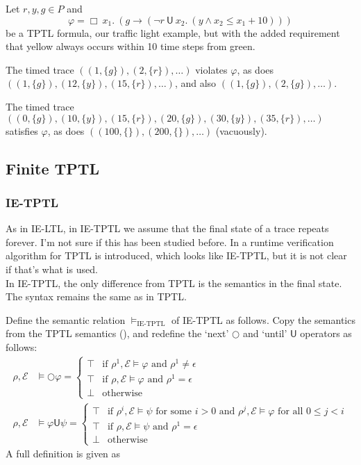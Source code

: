 \documentclass[a4paper]{article}
\newcommand{\U}{\mathsf{U}}
\newcommand{\tand}{\text{ and }}
\newcommand{\fsome}{\text{ for some }}
\newcommand{\fall}{\text{ for all }}
\newcommand{\eval}{\mathcal{E}}
\begin{document}
\begin{eg}\label{tptleg}
  Let $r,y,g\in P$ and \[\varphi = \Box ~x_1.~ (g \to (\neg r ~\U~ x_2.~ (y \land x_2 \leq x_1 + 10) ))\] be a TPTL formula, our traffic light example, but with the added requirement that yellow always occurs within 10 time steps from green.

  The timed trace $((1,\{g\}),(2,\{r\}),\dots)$ violates $\varphi$, as does $((1,\{g\}),(12,\{y\}),(15,\{r\}),\dots)$, and also $((1,\{g\}),(2,\{g\}),\dots)$.

  The timed trace $((0,\{g\}),(10,\{y\}),(15,\{r\}),(20,\{g\}),(30,\{y\}),(35,\{r\}),\dots)$ satisfies $\varphi$, as does $((100,\{\}),(200,\{\}),\dots)$ (vacuously).

\end{eg}

\subsection{Finite TPTL}

\subsubsection{IE-TPTL} As in IE-LTL, in IE-TPTL we assume that the final state of a trace repeats forever. I'm not sure if this has been studied before. In \textcite{chai2013rewriting} a runtime verification algorithm for TPTL is introduced, which looks like IE-TPTL, but it is not clear if that's what is used.\\
In IE-TPTL, the only difference from TPTL is the semantics in the final state. The syntax remains the same as in TPTL.

\begin{defn}\label{ietptlsem}

  Define the semantic relation $\vDash_{\text{IE-TPTL}}$ of IE-TPTL as follows. Copy the semantics from the TPTL semantics (), and redefine the `next' $\bigcirc$ and `until' $\U$ operators as follows:
  \begin{align*}
    \rho,\eval&\vDash \bigcirc \varphi =
    \begin{cases}
      \top &\text{if } \rho^1,\eval \vDash \varphi \tand \rho^1 \ne \epsilon\\
      \top &\text{if } \rho,\eval\vDash \varphi \tand \rho^1 = \epsilon\\
      \bot &\text{otherwise}
    \end{cases}\\
    \rho,\eval&\vDash \varphi \U \psi =
    \begin{cases}
      \top &\text{if } \rho^i,\eval \vDash \psi \fsome i > 0 \tand \rho^j,\eval \vDash \varphi \fall 0 \leq j < i\\
      \top &\text{if } \rho,\eval\vDash \psi \tand \rho^1 = \epsilon\\
      \bot &\text{otherwise}
    \end{cases}
  \end{align*}
  A full definition is given as 
\end{defn}
\end{document}
